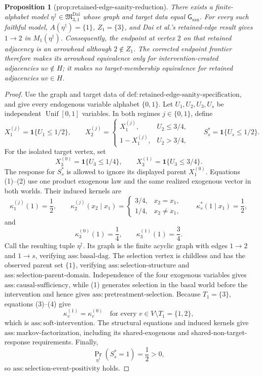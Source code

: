 \documentclass{article}
\newtheorem{proposition}{Proposition}
\begin{document}
\begin{proposition}[prop:retained-edge-sanity-reduction]\label{prop:retained-edge-sanity-reduction}
There exists a finite-alphabet model \(\eta^\dagger\in\mathfrak M_{3,1}^{\mathrm{Dai}}\) whose graph and target data equal \(\mathsf G_{\mathrm{san}}\). For every such faithful model, \(A(\eta^\dagger)=\{1\}\), \(Z_1=\{3\}\), and Dai et al.'s retained-edge result gives \(1\to2\) in \(M_1(\eta^\dagger)\). Consequently, the endpoint at vertex \(2\) on that retained adjacency is an arrowhead although \(2\notin Z_1\). The corrected endpoint frontier therefore makes its arrowhead equivalence only for intervention-created adjacencies \(uv\notin H\); it makes no target-membership equivalence for retained adjacencies \(uv\in H\).
\end{proposition}
\begin{proof}
Use the graph and target data of \(\mathrm{def:retained\mbox{-}edge\mbox{-}sanity\mbox{-}specification}\), and give every endogenous variable alphabet \(\{0,1\}\).  Let \(U_1,U_2,U_3,U_s\) be independent \(\operatorname{Unif}[0,1]\) variables.  In both regimes \(j\in\{0,1\}\), define
\[
 X_1^{(j)}=\boldsymbol 1\{U_1\leq 1/2\},
 \qquad
 X_2^{(j)}=
 \begin{cases}
 X_1^{(j)},&U_2\leq3/4,\\
 1-X_1^{(j)},&U_2>3/4,
 \end{cases}
 \qquad
 S_s^*=\boldsymbol 1\{U_s\leq1/2\}.
 \tag{1}
\]
For the isolated target vertex, set
\[
 X_3^{(0)}=\boldsymbol 1\{U_3\leq1/4\},
 \qquad
 X_3^{(1)}=\boldsymbol 1\{U_3\leq3/4\}.
 \tag{2}
\]
The response for \(S_s^*\) is allowed to ignore its displayed parent \(X_1^{(0)}\).  Equations (1)--(2) use one product exogenous law and the same realized exogenous vector in both worlds.  Their induced kernels are
\[
 \kappa_1^{(j)}(1)=\frac12,
 \qquad
 \kappa_2^{(j)}(x_2\mid x_1)=
 \begin{cases}
 3/4,&x_2=x_1,\\
 1/4,&x_2\ne x_1,
 \end{cases}
 \qquad
 \kappa_s^*(1\mid x_1)=\frac12,
 \tag{3}
\]
and
\[
 \kappa_3^{(0)}(1)=\frac14,
 \qquad
 \kappa_3^{(1)}(1)=\frac34.
 \tag{4}
\]
Call the resulting tuple \(\eta^\dagger\).  Its graph is the finite acyclic graph with edges \(1\to2\) and \(1\to s\), verifying \(\mathrm{ass:basal\mbox{-}dag}\).  The selection vertex is childless and has the observed parent set \(\{1\}\), verifying \(\mathrm{ass:selection\mbox{-}structure}\) and \(\mathrm{ass:selection\mbox{-}parent\mbox{-}domain}\).  Independence of the four exogenous variables gives \(\mathrm{ass:causal\mbox{-}sufficiency}\), while (1) generates selection in the basal world before the intervention and hence gives \(\mathrm{ass:pretreatment\mbox{-}selection}\).  Because \(T_1=\{3\}\), equations (3)--(4) give
\[
 \kappa_v^{(1)}=\kappa_v^{(0)}
 \quad\text{for every }v\in V\setminus T_1=\{1,2\},
 \tag{5}
\]
which is \(\mathrm{ass:soft\mbox{-}intervention}\).  The structural equations and induced kernels give \(\mathrm{ass:markov\mbox{-}factorization}\), including its shared-exogenous and shared-non-target-response requirements.  Finally,
\[
 \Pr_{\eta^\dagger}(S_s^*=1)=\frac12>0,
 \tag{6}
\]
so \(\mathrm{ass:selection\mbox{-}event\mbox{-}positivity}\) holds.


\end{proof}
\end{document}
